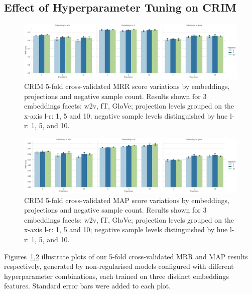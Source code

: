 \subsection{Effect of Hyperparameter Tuning on CRIM} \label{hyper_effect_CRIM}
\begin{figure}[ht!] 
  \centering
  \includegraphics[width=1.\linewidth]{images/CRIM_MRR_score_projection_and_negative_sample.png}
  \caption[CRIM MRR score variations by embeddings, projections, and negative sample count]{CRIM 5-fold cross-validated MRR score variations by embeddings, projections and negative sample count.  Results shown for 3 embeddings facets: w2v, fT, GloVe; projection levels grouped on the x-axis l-r: 1, 5 and 10; negative sample levels distinguished by hue l-r: 1, 5, and 10.}
  \label{fig:crim_hyper_mrr}
\end{figure}
\begin{figure}[ht!] 
  \centering
  \includegraphics[width=1.\linewidth]{images/CRIM_MAP_score_projection_and_negative_sample.png}
  \caption[CRIM MAP score variations by embeddings, projections, and negative sample count]{CRIM 5-fold cross-validated MAP score variations by embeddings, projections and negative sample count.  Results shown for 3 embeddings facets: w2v, fT, GloVe; projection levels grouped on the x-axis l-r: 1, 5 and 10; negative sample levels distinguished by hue l-r: 1, 5, and 10.}
  \label{fig:crim_hyper_map}
\end{figure}
Figures~\ref{fig:crim_hyper_mrr},\ref{fig:crim_hyper_map} illustrate plots of our 5-fold cross-validated \ac{MRR} and \ac{MAP} results respectively, generated by non-regularised models configured with different hyperparameter combinations, each trained on three distinct embeddings features.  Standard error bars were added to each plot.  

